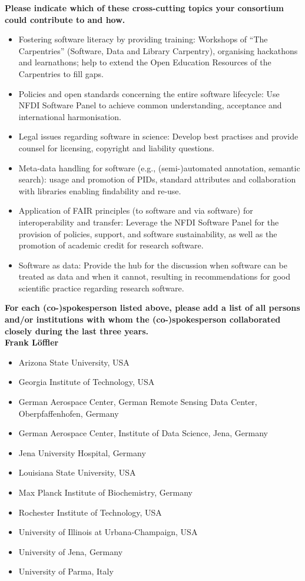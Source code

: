 \documentclass[11pt,a4paper,DIV=11]{scrlttr2}
\begin{document}
\begin{letter}{}
\vspace{1em}
\textbf{Please indicate which of these cross-cutting topics your consortium could contribute to and how.}\\
\begin{itemize}
\item Fostering software literacy by providing training: Workshops of  “The Carpentries” (Software, Data and Library Carpentry), organising hackathons and learnathons; help to extend the Open Education Resources of the Carpentries to fill gaps.
\item Policies and open standards concerning the entire software lifecycle: Use NFDI Software Panel to achieve common understanding, acceptance and international harmonisation.
\item Legal issues regarding software in science: Develop best practises and provide counsel for licensing, copyright and liability questions.
\item Meta-data handling for software (e.g., (semi-)automated annotation, semantic search): usage and promotion of PIDs, standard attributes and collaboration with libraries enabling findability and re-use.
\item Application of FAIR principles (to software and via software) for interoperability and transfer: Leverage the NFDI Software Panel for the provision of policies, support, and software sustainability, as well as the promotion of academic credit for research software.
\item Software as data: Provide the hub for the discussion when software can be treated as data and when it cannot, resulting in recommendations for good scientific practice regarding research software.
\end{itemize}

\clearpage
{}

\textbf{For each (co-)spokesperson listed above, please add a list of all persons and/or
institutions with whom the (co-)spokesperson collaborated closely during the last
three years.}\\


\textbf{Frank Löffler}
\begin{itemize}
 \setlength\itemsep{0em}
\item Arizona State University, USA
\item Georgia Institute of Technology, USA
\item German Aerospace Center, German Remote Sensing Data Center, Oberpfaffenhofen, Germany
\item German Aerospace Center, Institute of Data Science, Jena, Germany
\item Jena University Hospital, Germany
\item Louisiana State University, USA
\item Max Planck Institute of Biochemistry, Germany
\item Rochester Institute of Technology, USA
\item University of Illinois at Urbana-Champaign, USA
\item University of Jena, Germany
\item University of Parma, Italy
\end{itemize}


\end{letter}
\end{document}
